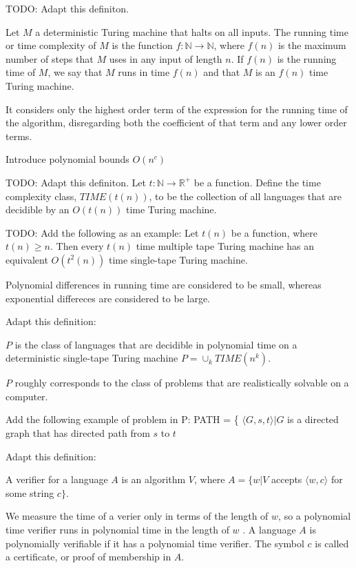 {\color{red} TODO: Adapt this definiton.}
\begin{definition}
Let $M$ a deterministic Turing machine that halts on all inputs. The running time or time complexity of $M$ is the function $f:\mathbb{N}\rightarrow\mathbb{N}$, where $f(n)$ is the maximum number of steps that $M$ uses in any input of length $n$. If $f(n)$ is the running time of $M$, we say that $M$ runs in time $f(n)$ and that $M$ is an $f(n)$ time Turing machine.
\end{definition}

{\color{red} It considers only the highest order term of the expression for the running time of the algorithm, disregarding both the coefficient of that term and any lower order terms.}

{\color{red} Introduce polynomial bounds $O(n^c)$}

{\color{red} TODO: Adapt this definiton.}
Let $t:\mathbb{N}\rightarrow\mathbb{R}^{+}$ be a function. Define the time complexity class, $TIME(t(n))$, to be the collection of all languages that are decidible by an $O(t(n))$ time Turing machine.

{\color{red} TODO: Add the following as an example:
Let $t(n)$ be a function, where $t(n)\geq n$. Then every $t(n)$ time multiple tape Turing machine has an equivalent $O(t^{2}(n))$ time single-tape Turing machine.
}

{\color{red} Polynomial differences in running time are considered to be small, whereas exponential differeces are considered to be large.}


{\color{red} Adapt this definition:
\begin{definition}
$P$ is the class of languages that are decidible in polynomial time on a deterministic single-tape Turing machine $P=\cup_{k}TIME(n^{k})$.
\end{definition} 

$P$ roughly corresponds to the class of problems that are realistically solvable on a computer.}

{\color{red} Add the following example of problem in P: PATH = \{ $\langle G,s,t\rangle|G$ is a directed graph that has directed path from $s$ to $t$ }

{\color{red} Adapt this definition:
\begin{definition}
A verifier for a language $A$ is an algorithm $V$, where $A=\{w|V$ accepts $\langle w, c\rangle$ for some string $c\}$.
\end{definition}
}

{\color{red} We measure the time of a verier only in terms of the length of $w$, so a polynomial time verifier runs in polynomial time in the length of $w$
. A language $A$ is polynomially verifiable if it has a polynomial time verifier. The symbol $c$ is called a certificate, or proof of membership in $A$.}

